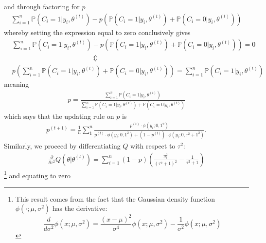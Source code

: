 and through factoring for $p$ 
\begin{align*}
    \sum_{i=1}^{n} \mathbb{P}\left(C_i = 1 | y_i, \theta^{(t)}\right) - p \left( \mathbb{P}\left(C_i = 1 | y_i, \theta^{(t)}\right) + \mathbb{P}\left(C_i = 0 | y_i, \theta^{(t)}\right)\right)
\end{align*}
whereby setting the expression equal to zero conclusively gives 
\begin{align*}
    & \sum_{i=1}^{n} \mathbb{P}\left(C_i = 1 | y_i, \theta^{(t)}\right) - p \left( \mathbb{P}\left(C_i = 1 | y_i, \theta^{(t)}\right) + \mathbb{P}\left(C_i = 0 | y_i, \theta^{(t)}\right)\right) = 0 \\[8pt]
    & \hspace{5cm} \Updownarrow \\[8pt]
    & p \left( \sum_{i=1}^{n}  \mathbb{P}\left(C_i = 1 | y_i, \theta^{(t)}\right) + \mathbb{P}\left(C_i = 0 | y_i, \theta^{(t)}\right) \right) = \sum_{i=1}^{n} \mathbb{P}\left(C_i = 1 | y_i, \theta^{(t)}\right)
\end{align*}
meaning 
\begin{align*}
    p = \frac{\sum_{i=1}^{n} \mathbb{P}\left(C_i = 1 | y_i, \theta^{(t)}\right)}{\sum_{i=1}^{n}  \mathbb{P}\left(C_i = 1 | y_i, \theta^{(t)}\right) + \mathbb{P}\left(C_i = 0 | y_i, \theta^{(t)}\right)}
\end{align*}
which says that the updating rule on $p$ is 
\begin{align}
    p^{(t+1)} = \frac{1}{n} \sum_{1}^{n} \frac{p^{(t)} \cdot \phi\left(y_i ; 0,1^2\right)}{p^{(t)} \cdot \phi\left(y_i ; 0,1^2\right)+(1-p^{(t)}) \cdot \phi\left(y_i ; 0, \tau^2+1^2\right)}.
\end{align}
Similarly, we proceed by differentiating $Q$ with respect to $\tau^2$:
\begin{align}
    \frac{\partial }{\partial \tau^2} Q (\theta | \theta^{(t)}) = \sum_{i=1}^{n} (1 - p) \left(\frac{y_{i}^2}{(\tau^2 +1)^2} - \frac{1}{\tau^2 + 1} \right)
\end{align}
\footnote{This result comes from the fact that the Gaussian density function \(\phi(\cdot ; \mu, \sigma^2)\) has the derivative:
\[\frac{d}{d\sigma^2} \phi(x ; \mu, \sigma^2) = \frac{(x - \mu)^2}{\sigma^4} \phi(x ; \mu, \sigma^2) - \frac{1}{\sigma^2} \phi(x ; \mu, \sigma^2)\]} and equating to zero
